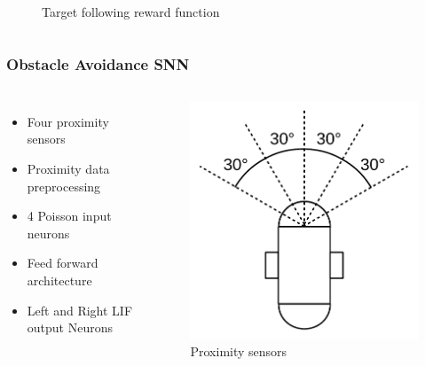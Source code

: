 \begin{frame}
\begin{columns}
\begin{overprint}
\begin{figure}
					\caption{Target following reward function}
					\label{fig:angle_reward}
				\end{figure}
			\end{overprint}
	\end{columns}
\end{frame}

\begin{frame}
	\frametitle{Obstacle Avoidance SNN}
	\begin{columns}
			\begin{itemize}
				\item <1-> Four proximity sensors
				\item <2-> Proximity data preprocessing
				\item <3-> 4 Poisson input neurons
				\item <3-> Feed forward architecture
				\item <3-> Left and Right LIF output Neurons
			\end{itemize}
			\begin{overprint}
				\begin{figure}
					\centering
					\includegraphics[height=0.7\textheight]{img/sensors_b.pdf}
					\caption{Proximity sensors}
					\label{fig:sensor_b}

\end{figure}
\end{overprint}
\end{columns}
\end{frame}

